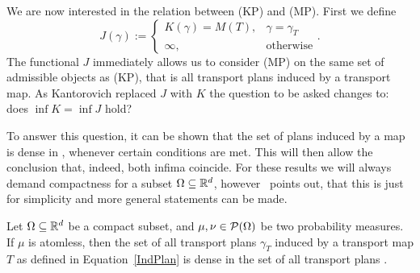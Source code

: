 We are now interested in the relation between (KP) and (MP). First we define
\[ J(\gamma) := 
	\begin{cases}
		K(\gamma) = M(T), & \gamma = \gamma_T \\
		\infty, & \text{otherwise}
	\end{cases}. \]
The functional $J$ immediately allows us to consider (MP) on the same set of admissible objects as (KP), that is all transport plans induced by a transport map. As Kantorovich replaced $J$ with $K$ the question to be asked changes to: does $\inf K = \inf J$ hold?

To answer this question, it can be shown that the set of plans induced by a map is dense in \TP{\mu}{\nu}, whenever certain conditions are met. This will then allow the conclusion that, indeed, both infima coincide. For these results we will always demand compactness for a subset $\Omega \subseteq \mathbb{R}^d$, however~\cite{San2015} points out, that this is just for simplicity and more general statements can be made.

	


\begin{theorem}\label{IndPlansDense}
	Let $\Omega \subseteq \mathbb{R}^d$ be a compact subset, and $\mu, \nu \in \mathcal{P}(\Omega)$ be two probability measures. If $\mu$ is atomless, then the set of all transport plans $\gamma_T$ induced by a transport map $T$ as defined in Equation~\ref{IndPlan} is dense in the set of all transport plans \TP{\mu}{\nu}.
\end{theorem}

